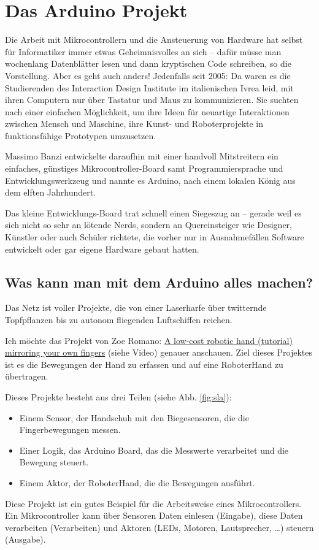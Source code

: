 
\section{Das Arduino Projekt}

Die Arbeit mit Mikrocontrollern und die Ansteuerung von Hardware hat selbst für Informatiker immer etwas Geheimnisvolles an sich – dafür müsse man wochenlang Datenblätter lesen und dann kryptischen Code schreiben, so die Vorstellung. Aber es geht auch anders! Jedenfalls seit 2005: Da waren es die Studierenden des Interaction Design Institute im italienischen Ivrea leid, mit ihren Computern nur über Tastatur und Maus zu kommunizieren. Sie suchten nach einer einfachen Möglichkeit, um ihre Ideen für neuartige Interaktionen zwischen Mensch und Maschine, ihre Kunst- und Roboterprojekte in funktionsfähige Prototypen umzusetzen. 

Massimo Banzi entwickelte daraufhin mit einer handvoll Mitstreitern ein einfaches, günstiges Mikrocontroller-Board samt Programmiersprache und Entwicklungswerkzeug und nannte es Arduino, nach einem lokalen König aus dem elften Jahrhundert.

Das kleine Entwicklungs-Board trat schnell einen Siegeszug an – gerade weil es sich nicht so sehr an lötende Nerds, sondern an Quereinsteiger wie Designer, Künstler oder auch Schüler richtete, die vorher nur in Ausnahmefällen Software entwickelt oder gar eigene Hardware gebaut hatten. 

\subsection{Was kann man mit dem Arduino alles machen?}

Das Netz ist voller Projekte, die von einer Laserharfe über twitternde Topfpflanzen bis zu autonom fliegenden Luftschiffen reichen.

Ich möchte das Projekt von Zoe Romano: 
\href{http://blog.arduino.cc/2014/07/17/a-low-cost-robotic-hand-tutorial-mirroring-your-own-fingers/}{A low-cost robotic hand (tutorial) mirroring your own fingers} (siehe Video)
genauer anschauen. Ziel dieses Projektes ist es die Bewegungen der Hand zu erfassen und auf eine RoboterHand zu übertragen.

Dieses Projekte besteht aus drei Teilen (siehe Abb. \ref{fig:sla}):
 
\begin{itemize}
  \item Einem Sensor, der Handschuh mit den Biegesensoren, die die Fingerbewegungen messen. 
  \item Einer Logik, das Arduino Board, das die Messwerte verarbeitet und die Bewegung steuert.
  \item Einem Aktor, der RoboterHand, die die Bewegungen ausführt. 
\end{itemize}
Diese Projekt ist ein gutes Beispiel für die Arbeitsweise eines Mikrocontrollers. Ein Mikrocontroller kann über Sensoren Daten einlesen  (Eingabe), diese Daten verarbeiten (Verarbeiten) und Aktoren (LEDs, Motoren, Lautsprecher, \dots) steuern (Ausgabe).   

